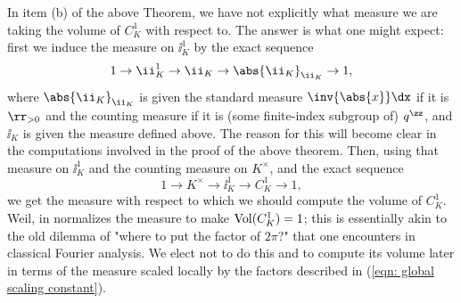 \documentclass[11pt, x11names, openany]{book}
\begin{document}
\begin{remark}
In item (b) of the above Theorem, we have not explicitly what measure we are taking the volume of $C^1_K$ with respect to. The answer is what one might expect: first we induce the measure on $\ii^1_K$ by the exact sequence
\begin{equation*}
    1 \to \ii^1_K \to \ii_K \to \abs{\ii_K}_{\ii_K} \to 1,
\end{equation*}
where $\abs{\ii_K}_{\ii_K}$ is given the standard measure $\inv{\abs{x}}\dx$ if it is $\rr_{> 0}$ and the counting measure if it is (some finite-index subgroup of) $q^\zz$, and $\ii_K$ is given the measure defined above. The reason for this will become clear in the computations involved in the proof of the above theorem. Then, using that measure on $\ii^1_K$ and the counting measure on $K^\times$, and the exact sequence 
\begin{equation*}
    1 \to K^\times \to \ii^1_K \to C^1_K \to 1,
\end{equation*}
we get the measure with respect to which we should compute the volume of $C^1_K$.
Weil, in \cite{weil1974basic} normalizes the measure to make $\operatorname{Vol}(C^1_K) = 1$; this is essentially akin to the old dilemma of "where to put the factor of $2\pi$?" that one encounters in classical Fourier analysis. We elect not to do this and to compute its volume later in terms of the measure scaled locally by the factors described in (\ref{eqn: global scaling constant}).
\end{remark}
\end{document}
